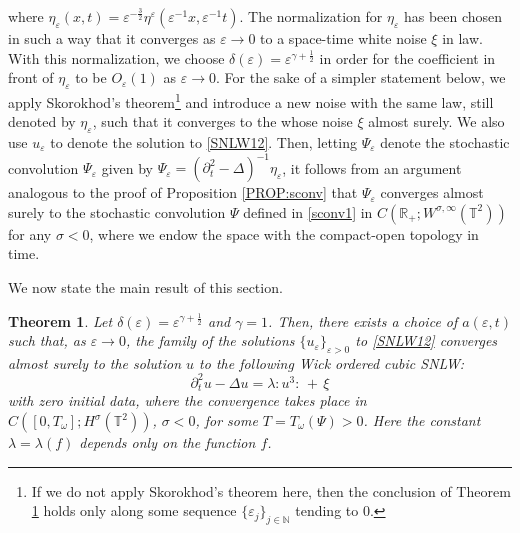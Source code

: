\documentclass[letterpaper, 11pt,  reqno]{amsart}
\newtheorem{theorem}{Theorem} [section]
\newcommand{\1}{\hspace{0.5mm}\text{I}\hspace{0.5mm}}
\newcommand{\noi}{\noindent}
\newcommand{\R}{\mathbb{R}}
\newcommand{\T}{\mathbb{T}}
\newcommand{\Dl}{\Delta}
\newcommand{\eps}{\varepsilon}
\newcommand{\g}{\gamma}
\newcommand{\s}{\sigma}
\newcommand{\dt}{\partial_t}
\renewcommand{\o}{\omega}
\newcommand{\N}{\mathbb{N}}
\numberwithin{equation}{section}
\numberwithin{theorem}{section}
\newcommand{\notemax}[1]{\marginpar{\color{red} $\Leftarrow\Leftarrow\Leftarrow$}{\color{red}MAX: #1}}
\begin{document}
\noi
where $\eta_{\eps} (x, t) = \eps^{- \frac 3  2} \eta^\eps (\eps^{-1} x, \eps^{- 1} t)$. 
The normalization for $\eta_{\eps}$ has
been chosen in such a way that it converges as $\eps \rightarrow 0$
to a space-time white noise $\xi$ in law.
With this normalization, we  choose
$\delta (\eps) = \eps^{\g + \frac 1 2}$ in order for the
coefficient in front of $\eta_{\eps}$ to be $O_{\eps} (1)$ as
$\eps \rightarrow 0$.
For the sake of a simpler statement below, 
we apply Skorokhod's theorem\footnote{If we do not apply
Skorokhod's theorem here, then the conclusion of Theorem \ref{THM:2} 
holds only along some sequence $\{\eps_j\}_{j \in \N}$ tending to 0.}
and introduce a new noise with the same law, still denoted by $\eta_\eps$,
such that it converges to the whose noise $\xi$ 
almost surely.
We also use $u_\eps$ to denote the solution to \eqref{SNLW12}.
Then, letting $\Psi_\eps$ denote the  stochastic convolution $\Psi_\eps$ 
given by  $\Psi_{\eps} = (\dt^2 - \Dl)^{-1} \eta_\eps$, 
%
it follows from an argument analogous to the proof of Proposition \ref{PROP:sconv}
that $\Psi_\eps$ converges almost surely to the stochastic convolution $\Psi$ defined in \eqref{sconv1}
 in $C(\R_+; W^{\s, \infty}(\T^2))$ for any $\s <0$,
where we endow the space with the compact-open topology in time.

We now state the  main result of this section.

\begin{theorem}\label{THM:2}
  Let $\delta (\eps) = \eps^{\g + \frac 12}$ and $\gamma = 1$.
 Then,  there exists a choice of $a (\eps, t)$ such that, as $\eps \to 0$, 
 the family of %
the solutions   $\{u_{\eps}\}_{\eps>0}$ to \eqref{SNLW12} converges 
almost surely 
 to  the solution $u$ to the following  Wick ordered cubic SNLW:
  \begin{equation}
\dt^2 u - \Dl  u = \lambda : \!u^3 \!: \, + \, \xi
    \label{SNLW_ld}
  \end{equation}
  with zero initial data,
where the convergence takes place  
in $C([0, T_\o]; H^\s(\T^2))$, $\s < 0$,  for some  $T = T_\o(\Psi)>0$.
   Here the constant $\lambda = \lambda (f)$
  depends only on the function $f$.

\end{theorem}
\end{document}
